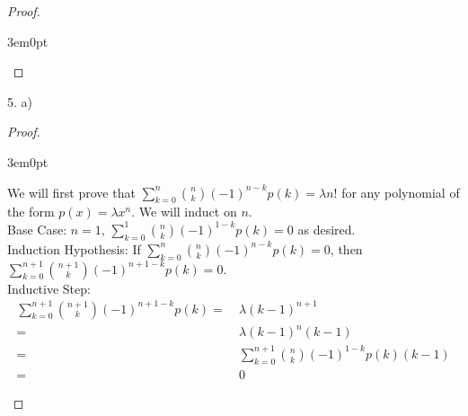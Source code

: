 \documentclass[11pt]{article}
\newenvironment{myproof}
{\begin{proof} \begin{adjustwidth}{3em}{0pt}$ $\par\nobreak\ignorespaces}
{\end{adjustwidth} \end{proof}}
\begin{document}
\begin{flushleft}
\begin{myproof}
\end{myproof}

\newpage

5. a)

\begin{myproof}

We will first prove that $\sum_{k=0}^n {n \choose k}(-1)^{n-k}p(k) = \lambda n!$ for any polynomial of the form $p(x) = \lambda x^n$. We will induct on $n$. \\
Base Case: $n = 1$, $\sum_{k=0}^1 {n \choose k}(-1)^{1-k}p(k) = 0$ as desired. \\
Induction Hypothesis: If $\sum_{k=0}^n {n \choose k}(-1)^{n-k}p(k) = 0$, then $\sum_{k=0}^{n+1} {n+1 \choose k}(-1)^{n+1-k}p(k) = 0$. \\
Inductive Step: 
\begin{align*}
\sum_{k=0}^{n+1} {n+1 \choose k}(-1)^{n+1-k}p(k) = & \ \lambda (k-1)^{n+1} \\
= & \ \lambda (k-1)^n (k-1) \\
= & \ \sum_{k=0}^{n+1} {n \choose k}(-1)^{1-k}p(k) (k-1) \\
= & \ 0
\end{align*}

\end{myproof}



\end{flushleft}
\end{document}
